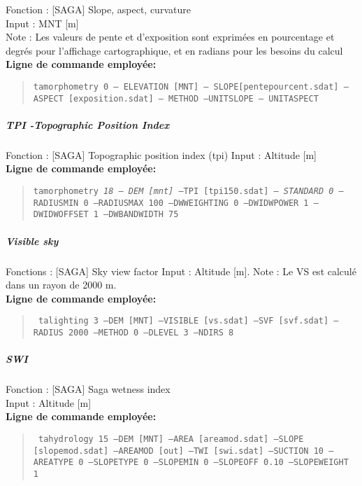 Fonction : [SAGA] Slope, aspect, curvature \\
Input : MNT [m] \\
Note : Les valeurs de pente et d'exposition sont exprimées en pourcentage et degrés pour l’affichage cartographique, et en radians pour les besoins du calcul \\

\textbf{Ligne de commande employée:} \\
\begin{quote}
\texttt{ta\textunderscore morphometry 0 -- ELEVATION  [MNT]  -- SLOPE[pente\textunderscore pourcent.sdat] \; --ASPECT [exposition.sdat] \; -- METHOD \; --UNIT\textunderscore SLOPE   -- UNIT\textunderscore ASPECT  }
\end{quote}

\subparagraph{TPI -Topographic Position Index} 

Fonction : [SAGA] Topographic position index (tpi) \newline
Input : Altitude [m]\\
\textbf{Ligne de commande employée:} 
\begin{quote}
\texttt{ta\textunderscore morphometry \textit{18} -- \textit{DEM [mnt]} --TPI [tpi\textunderscore 150.sdat] -- \textit{STANDARD 0} --RADIUS\textunderscore MIN 0 --RADIUS\textunderscore MAX 100 --DW\textunderscore WEIGHTING 0 --DW\textunderscore IDW\textunderscore POWER 1 --DW\textunderscore IDW\textunderscore OFFSET 1 --DW\textunderscore BANDWIDTH 75}
\end{quote}
\subparagraph{Visible sky} 

Fonctions : [SAGA] Sky view factor Input : Altitude [m]. Note : Le VS est calculé dans un rayon de 2000 m. \\
\textbf{Ligne de commande employée:} 
\begin{quote}
\texttt{ ta\textunderscore lighting 3 --DEM [MNT] --VISIBLE [vs.sdat] --SVF [svf.sdat] --RADIUS 2000 --METHOD              0 --DLEVEL 3 --NDIRS 8}
\end{quote}
\subparagraph{SWI} 

Fonction : [SAGA] Saga wetness index \\
Input : Altitude [m] \\
\textbf{Ligne de commande employée:} 
\begin{quote}
 \texttt{ ta\textunderscore hydrology 15 --DEM [MNT] --AREA [area\textunderscore mod.sdat] --SLOPE [slope\textunderscore mod.sdat] --AREA\textunderscore MOD [out] --TWI [swi.sdat] \; --SUCTION 10 \; --AREA\textunderscore TYPE 0 \; --SLOPE\textunderscore TYPE 0 --SLOPE\textunderscore MIN 0 \; --SLOPE\textunderscore OFF 0.10 --SLOPE\textunderscore WEIGHT 1}
\end{quote}

